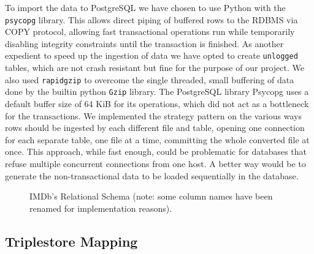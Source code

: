 \documentclass[a4paper,10pt]{article}
\begin{document}
To import the data to PostgreSQL we have chosen to use Python with the
\texttt{psycopg} library. This allows direct piping of buffered rows
to the RDBMS via COPY protocol, allowing fast transactional operations
run while temporarily disabling integrity constraints until the
transaction is finished. As another expedient to speed up the
ingestion of data we have opted to create \texttt{unlogged} tables,
which are not crash resistant but fine for the purpose of our
project. We also used \texttt{rapidgzip} to overcome the single
threaded, small buffering of data done by the builtin python
\texttt{Gzip} library. The PostgreSQL library Psycopg uses a default
buffer size of 64 KiB for its operations, which did not act as a
bottleneck for the transactions. We implemented the strategy pattern
on the various ways rows should be ingested by each different file and
table, opening one connection for each separate table, one file at a
time, committing the whole converted file at once. This approach,
while fast enough, could be problematic for databases that refuse
multiple concurrent connections from one host. A better way would be
to generate the non-transactional data to be loaded sequentially in
the database.

\begin{figure}
  \begin{centering}
    
    \caption[IMDb Relational Schema]{IMDb's Relational Schema (note:
      some column names have been renamed for implementation
      reasons).}
    \label{fig:IMDb Relational Schema}
  \end{centering}
\end{figure}


\subsection{Triplestore Mapping}
\end{document}
